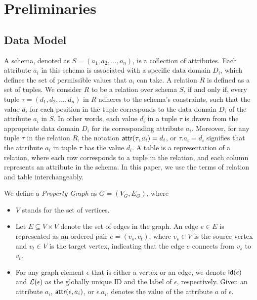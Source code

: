 \section{Preliminaries}
\label{sec:preliminaries}

\subsection{Data Model}
\label{sec:data-model}

A schema, denoted as \(S = (a_1, a_2, \ldots, a_n)\), is a collection of attributes. Each attribute \(a_i\) in this schema is associated with a specific data domain \(D_i\), which defines the set of permissible values that \(a_i\) can take.
A relation \(R\) is defined as a set of tuples. We consider \(R\) to be a relation over schema \(S\), if and only if, every tuple \(\tau = (d_1, d_2, \ldots, d_n)\) in \(R\) adheres to the schema's constraints, such that the value \(d_i\) for each position in the tuple corresponds to the data domain \(D_i\) of the attribute \(a_i\) in \(S\). In other words, each value \(d_i\) in a tuple \(\tau\) is drawn from the appropriate data domain \(D_i\) for its corresponding attribute \(a_i\).
Moreover, for any tuple \(\tau\) in the relation \(R\), the notation \({\mathsf{attr}}(\tau, a_i) = d_i\), or \(\tau.a_i = d_i\) signifies that the attribute \(a_i\) in tuple \(\tau\) has the value \(d_i\). A table is a representation of a relation, where each row corresponds to a tuple in the relation, and each column represents an attribute in the schema. In this paper, we use the terms of relation and table interchangeably.

We define a \emph{Property Graph} as $G = (V_G, E_G)$,
where
\begin{itemize}
    \item $V$ stands for the set of vertices.
    \item Let $E \subseteq V \times V$ denote the set of edges in the graph. An edge $e \in E$ is represented as an ordered pair $e = (v_s, v_t)$, where $v_s \in V$ is the source vertex and $v_t \in V$ is the target vertex, indicating that the edge $e$ connects from $v_s$ to $v_t$.
    \item For any graph element $\epsilon$ that is either a vertex or an edge, we denote ${\mathsf{id}}(\epsilon)$ and $\mathcal{L}(\epsilon)$ as the globally unique ID and the label of $\epsilon$, respectively. Given an attribute $a_i$, ${\mathsf{attr}}(\epsilon, a_i)$, or $\epsilon.a_i$, denotes the value of the attribute $a$ of $\epsilon$.
\end{itemize}


